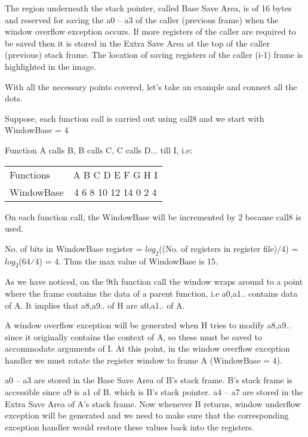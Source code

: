 The region underneath the stack pointer, called Base Save Area, is of 16 bytes and reserved for saving the a0 -- a3 of the caller (previous frame) when the window overflow exception occurs. If more registers of the caller are required to be saved then it is stored in the Extra Save Area at the top of the caller (previous) stack frame. The location of saving registers of the caller (i-1) frame is highlighted in the image.

With all the necessary points covered, let’s take an example and connect all the dots.

Suppose, each function call is carried out using call8 and we start with WindowBase = 4

Function A calls B, B calls C, C calls D... till I, i.e:

\newcommand{\calls}{\textrightarrow{}}
\begin{longtable}{lc}
Functions&  A \calls B \calls C \calls D \calls E \calls F \calls G \calls H \calls I\\
WindowBase& 4 \calls 6 \calls 8 \calls 10 \calls 12 \calls 14 \calls 0 \calls 2 \calls 4\\
\end{longtable}
\let\calls\undefined

On each function call, the WindowBase will be incremented by 2 because call8 is used.

No. of bits in WindowBase register = $log_{2}$((No. of registers in register file)/4) = $log_{2}$(64⁄4) = 4. Thus the max value of WindowBase is 15.

As we have noticed, on the 9th function call the window wraps around to a point where the frame contains the data of a parent function, i.e a0,a1.. contains data of A. It implies that a8,a9.. of H are a0,a1.. of A.

A window overflow exception will be generated when H tries to modify a8,a9.. since it originally contains the context of A, so these must be saved to accommodate arguments of I. At this point, in the window overflow exception handler we must rotate the register window to frame A (WindowBase = 4).

a0 -- a3 are stored in the Base Save Area of B’s stack frame. B’s stack frame is accessible since a9 is a1 of B, which is B’s stack pointer.
a4 -- a7 are stored in the Extra Save Area of A’s stack frame.
Now whenever B returns, window underflow exception will be generated and we need to make sure that the corresponding exception handler would restore these values back into the registers.

